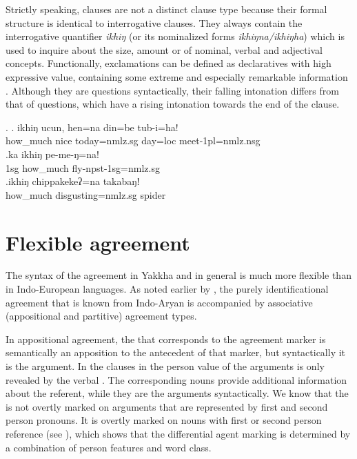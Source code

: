 Strictly speaking,  clauses are not a distinct clause type because their formal structure is identical to interrogative clauses. They always contain the interrogative quantifier \emph{ikhiŋ} (or its nominalized forms \emph{ikhiŋna/ikhiŋha}) which is used to inquire about the size, amount or  of nominal, verbal and adjectival concepts. Functionally, exclamations can be defined as declaratives with high expressive value, containing some extreme and especially remarkable information \citep[316]{Koenig2007_Speech}. Although they are questions syntactically, their falling intonation differs from that of questions, which have a rising intonation towards the end of the clause.

\ex. \ag. ikhiŋ   ucun, hen=na din=be    tub-i=ha!\\
how\_much nice today{\sc =nmlz.sg} day{\sc =loc} meet{\sc -1pl=nmlz.nsg}\\
 
\bg.ka  ikhiŋ   pe-me-ŋ=na!\\
{\sc 1sg} how\_much fly{\sc -npst-1sg=nmlz.sg}\\
 
\bg.ikhiŋ chippakekeʔ=na takabaŋǃ\\
how\_much disgusting{\sc =nmlz.sg} spider\\

\section{Flexible agreement}\label{flex-agr}

The syntax of the agreement in Yakkha and  in general is much more flexible than in Indo-European languages. As noted earlier by \cite{Bickel2000On-the-syntax}, the purely identificational agreement that is known from Indo-Aryan is accompanied by associative (appositional and partitive) agreement types. 

In appositional agreement, the  that corresponds to the agreement marker is semantically an apposition to the antecedent of that marker, but syntactically it is the argument. In the clauses in \Next the person value of the arguments is only revealed by the verbal . The corresponding nouns provide additional information about the referent, while  they are the arguments syntactically. We know that the   is not overtly marked on arguments that are represented by first and second person pronouns. It is overtly marked on nouns with first or second person reference (see \Next[c]), which shows that the differential agent marking is determined by a combination of person features and word class.

